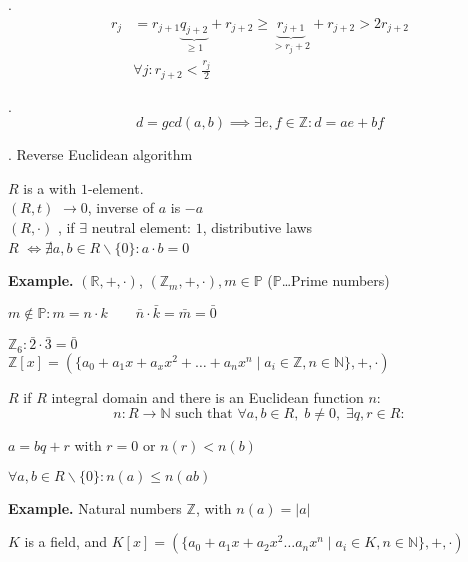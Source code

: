 \Remark.
\begin{align*}
  r_j &= r_{j + 1} \underbrace{q_{j+2}}_{ \geq 1} + r_{j+2} \geq \underbrace{r_{j+1}}_{ > r_j+2} + r_{j+2} > 2 r_{j+2} \\
      & \forall j: r_{j+2} < \frac{r_j}{2}
\end{align*}

\Theorem.
\[
  d = gcd(a,b) \implies \exists e,f \in \mathbb{Z}: d = ae + bf
\]

\Proof.
Reverse Euclidean algorithm

\begin{definition}
$R$ is a  with $1$-element.\\
$(R,t)$  $\rightarrow 0$, inverse of $a$ is $-a$\\
$(R,\cdot)$ , if $\exists$ neutral element: $1$, distributive laws\\
$R$  $\iff \nexists a,b \in R \backslash \{0\}: a \cdot b = 0$
\end{definition}

\textbf{Example.}
$(\mathbb{R}, +, \cdot)$, $(\mathbb{Z}_m, + , \cdot), m \in \mathbb{P}$ ($\mathbb{P}$…Prime numbers)

$m\not\in \mathbb{P}: m = n \cdot k \qquad \bar{n} \cdot \bar{k} = \bar{m} = \bar{0}$

$\mathbb{Z}_6 : \bar{2} \cdot \bar{3} = \bar{0}$ \\
$\mathbb{Z}[x] = (\{a_0 + a_1 x + a_x x^2 + \ldots + a_n x^n \mid a_i \in \mathbb{Z}, n \in \mathbb{N} \},+,\cdot)$

\begin{definition}
$R$  if $R$ integral domain and there is an Euclidean function $n$:
\[
  n : R \rightarrow \mathbb{N} \text{ such that } \forall a,b \in R,\; b \neq 0,\; \exists q,r \in R:
\]

\begin{compactenum}
\item $a = bq + r$ with $r = 0$ or $n(r) < n(b)$
\item $\forall a,b \in R \backslash \{0\} : n(a) \leq n(ab)$
\end{compactenum}
\end{definition}

\textbf{Example.}
Natural numbers $\mathbb{Z}$, with $n(a) = |a|$

$K$ is a field, and $K[x] =
\left(\{a_0 + a_1 x + a_2 x^2 \ldots a_n x^n \mid a_i \in K, n \in \mathbb{N} \}
,+, \cdot \right)$

